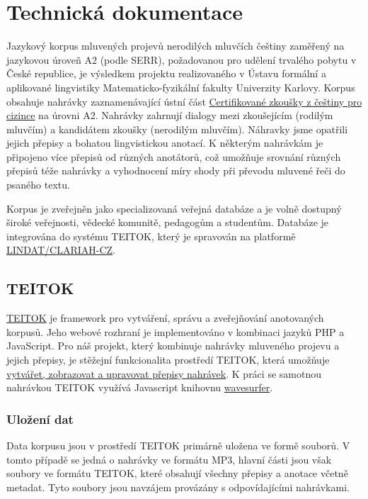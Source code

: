 \documentclass[
]{article}
\author{}
\date{}
\begin{document}
\hypertarget{technickuxe1-dokumentace}{%
\section{Technická dokumentace}\label{technickuxe1-dokumentace}}

Jazykový korpus mluvených projevů nerodilých mluvčích češtiny zaměřený
na jazykovou úroveň A2 (podle SERR), požadovanou pro udělení trvalého
pobytu v České republice, je výsledkem projektu realizovaného v Ústavu
formální a aplikované lingvistiky Matematicko-fyzikální fakulty
Univerzity Karlovy. Korpus obsahuje nahrávky zaznamenávající ústní část
\href{http://ujop.cuni.cz/cce}{Certifikované zkoušky z češtiny pro
cizince} na úrovni A2. Nahrávky zahrnují dialogy mezi zkoušejícím
(rodilým mluvčím) a kandidátem zkoušky (nerodilým mluvčím). Náhravky
jsme opatřili jejich přepisy a bohatou lingvistickou anotací. K některým
nahrávkám je připojeno více přepisů od různých anotátorů, což umožňuje
srovnání různých přepisů téže nahrávky a vyhodnocení míry shody při
převodu mluvené řeči do psaného textu.

Korpus je zveřejněn jako specializovaná veřejná databáze a je volně
dostupný široké veřejnosti, vědecké komunitě, pedagogům a studentům.
Databáze je integrována do systému TEITOK, který je spravován na
platformě \href{https://lindat.cz/}{LINDAT/CLARIAH-CZ}.

\hypertarget{teitok}{%
\subsection{TEITOK}\label{teitok}}

\href{http://teitok.corpuswiki.org/}{TEITOK} je framework pro vytváření,
správu a zveřejňování anotovaných korpusů. Jeho webové rozhraní je
implementováno v kombinaci jazyků PHP a JavaScript. Pro náš projekt,
který kombinuje nahrávky mluveného projevu a jejich přepisy, je stěžejní
funkcionalita prostředí TEITOK, která umožňuje
\href{http://www.teitok.org/index.php?action=help\&id=wavesurfer}{vytvářet,
zobrazovat a upravovat přepisy nahrávek}. K práci se samotnou nahrávkou
TEITOK využívá Javascript knihovnu
\href{http://wavesurfer-js.org/}{wavesurfer}.

\hypertarget{uloux17eenuxed-dat}{%
\subsubsection{Uložení dat}\label{uloux17eenuxed-dat}}

Data korpusu jsou v prostředí TEITOK primárně uložena ve formě souborů.
V tomto případě se jedná o nahrávky ve formátu MP3, hlavní části jsou
však soubory ve formátu TEITOK, které obsahují všechny přepisy a anotace
včetně metadat. Tyto soubory jsou navzájem provázány s odpovídajícími
nahrávkami.
\end{document}
